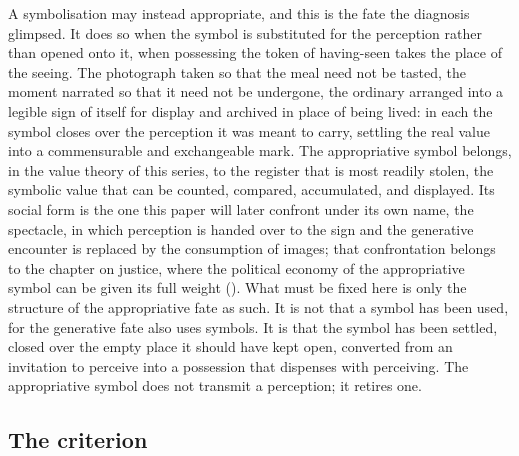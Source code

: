 A symbolisation may instead appropriate, and this is the fate the diagnosis glimpsed. It does so when the symbol is substituted for the perception rather than opened onto it, when possessing the token of having-seen takes the place of the seeing. The photograph taken so that the meal need not be tasted, the moment narrated so that it need not be undergone, the ordinary arranged into a legible sign of itself for display and archived in place of being lived: in each the symbol closes over the perception it was meant to carry, settling the real value into a commensurable and exchangeable mark. The appropriative symbol belongs, in the value theory of this series, to the register that is most readily stolen, the symbolic value that can be counted, compared, accumulated, and displayed. Its social form is the one this paper will later confront under its own name, the spectacle, in which perception is handed over to the sign and the generative encounter is replaced by the consumption of images; that confrontation belongs to the chapter on justice, where the political economy of the appropriative symbol can be given its full weight (). What must be fixed here is only the structure of the appropriative fate as such. It is not that a symbol has been used, for the generative fate also uses symbols. It is that the symbol has been settled, closed over the empty place it should have kept open, converted from an invitation to perceive into a possession that dispenses with perceiving. The appropriative symbol does not transmit a perception; it retires one.

\subsection{The criterion}
\label{p23:sub:sym-criterion}

